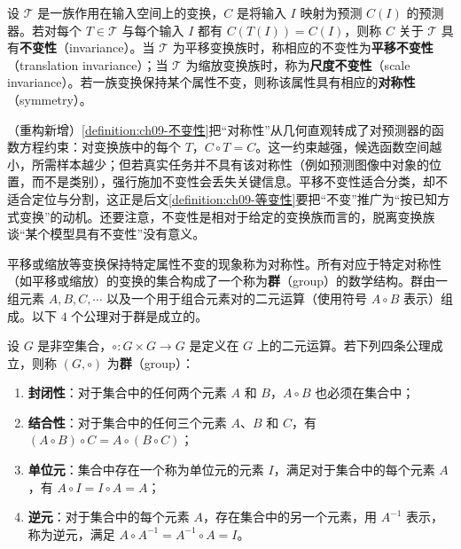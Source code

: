 \documentclass[../../main.tex]{subfiles}
\begin{document}
\begin{definition}[不变性与对称性]\label{definition:ch09-不变性}
设 $\mathcal{T}$ 是一族作用在输入空间上的变换，$C$ 是将输入 $I$ 映射为预测 $C(I)$ 的预测器。若对每个 $T\in\mathcal{T}$ 与每个输入 $I$ 都有 $C(T(I))=C(I)$，则称 $C$ 关于 $\mathcal{T}$ 具有\textbf{不变性}（invariance）。当 $\mathcal{T}$ 为平移变换族时，称相应的不变性为\textbf{平移不变性}（translation invariance）；当 $\mathcal{T}$ 为缩放变换族时，称为\textbf{尺度不变性}（scale invariance）。若一族变换保持某个属性不变，则称该属性具有相应的\textbf{对称性}（symmetry）。
\end{definition}

\begin{remark}（重构新增）\cref{definition:ch09-不变性}把“对称性”从几何直观转成了对预测器的函数方程约束：对变换族中的每个 $T$，$C\circ T=C$。这一约束越强，候选函数空间越小，所需样本越少；但若真实任务并不具有该对称性（例如预测图像中对象的位置，而不是类别），强行施加不变性会丢失关键信息。平移不变性适合分类，却不适合定位与分割，这正是后文\cref{definition:ch09-等变性}要把“不变”推广为“按已知方式变换”的动机。还要注意，不变性是相对于给定的变换族而言的，脱离变换族谈“某个模型具有不变性”没有意义。
\end{remark}

平移或缩放等变换保持特定属性不变的现象称为对称性。所有对应于特定对称性（如平移或缩放）的变换的集合构成了一个称为\textbf{群}（group）的数学结构。群由一组元素 $A,B,C,\cdots$ 以及一个用于组合元素对的二元运算（使用符号 $A\circ B$ 表示）组成。以下 $4$ 个公理对于群是成立的。

\begin{definition}[群]\label{definition:ch09-群}
设 $G$ 是非空集合，$\circ:G\times G\to G$ 是定义在 $G$ 上的二元运算。若下列四条公理成立，则称 $(G,\circ)$ 为\textbf{群}（group）：
\begin{enumerate}
\item \textbf{封闭性}：对于集合中的任何两个元素 $A$ 和 $B$，$A\circ B$ 也必须在集合中；
\item \textbf{结合性}：对于集合中的任何三个元素 $A$、$B$ 和 $C$，有 $(A\circ B)\circ C=A\circ(B\circ C)$；
\item \textbf{单位元}：集合中存在一个称为单位元的元素 $I$，满足对于集合中的每个元素 $A$，有 $A\circ I=I\circ A=A$；
\item \textbf{逆元}：对于集合中的每个元素 $A$，存在集合中的另一个元素，用 $A^{-1}$ 表示，称为逆元，满足 $A\circ A^{-1}=A^{-1}\circ A=I$。
\end{enumerate}
\end{definition}
\end{document}

